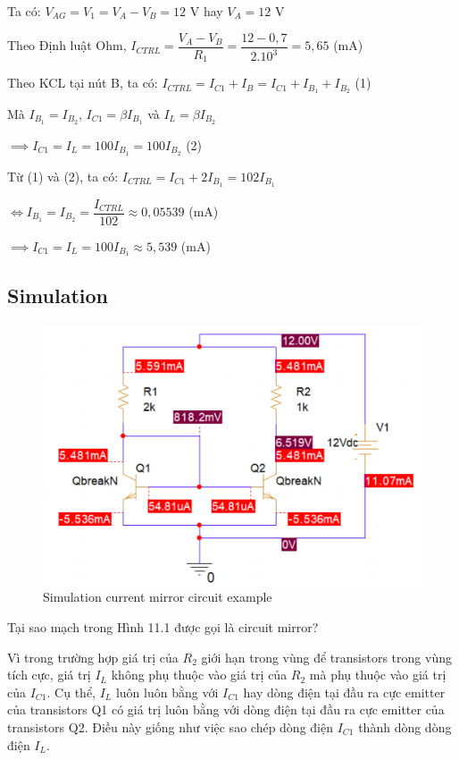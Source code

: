  Ta có: \(V_{AG} = V_1 = V_A - V_B = 12 \) V hay \(V_A = 12\) V

 Theo Định luật Ohm, \(I_{CTRL} = \dfrac{V_A - V_B}{R_1} = \dfrac{12 - 0,7}{2.10^3} = 5,65 \) (mA)

 Theo KCL tại nút B, ta có: \(I_{CTRL} = I_{C1} + I_B = I_{C1} + I_{B_1} + I_{B_2}\) (1)

 Mà \(I_{B_1} = I_{B_2}\), \(I_{C1} = \beta I_{B_1}\) và \(I_{L} = \beta I_{B_2}\)
 
 \(\implies I_{C1} = I_L = 100I_{B_1} = 100I_{B_2}\) (2)

 Từ (1) và (2), ta có: \(I_{CTRL} = I_{C1} + 2I_{B_1} = 102I_{B_1}\)

 \(\iff I_{B_1} = I_{B_2} = \dfrac{I_{CTRL}}{102} \approx 0,05539 \) (mA)

 \(\implies I_{C1} = I_L = 100I_{B_1} \approx 5,539\) (mA)

 \subsection{Simulation}
 
 \begin{figure}[ht]
    \centering
    \includegraphics[scale=0.3]{graphics/ex11/f2.png}
    \caption{Simulation current mirror circuit example}
\end{figure}

Tại sao mạch trong Hình 11.1 được gọi là circuit mirror?

Vì trong trường hợp giá trị của \(R_2\) giới hạn trong vùng để transistors trong vùng tích cực, giá trị \(I_L\) không phụ thuộc vào giá trị của \(R_2\)
mà phụ thuộc vào giá trị của \(I_{C1}\). Cụ thể, \(I_L\) luôn luôn bằng với \(I_{C1}\) hay dòng điện tại đầu ra cực emitter của transistors Q1 
có giá trị luôn bằng với dòng điện tại đầu ra cực emitter của transistors Q2. Điều này giống như việc sao chép dòng điện \(I_{C1}\) thành dòng dòng điện \(I_{L}\).

